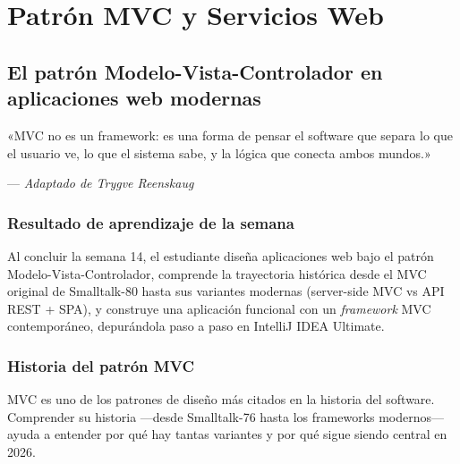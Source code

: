 \part{Patrón MVC y Servicios Web}

\chapter{El patrón Modelo-Vista-Controlador en aplicaciones web modernas}
\label{cap:semana14}

\epigraph{«MVC no es un framework: es una forma de pensar el software
que separa lo que el usuario ve, lo que el sistema sabe, y la lógica
que conecta ambos mundos.»}{--- \textit{Adaptado de Trygve Reenskaug}}

\section*{Resultado de aprendizaje de la semana}
Al concluir la semana 14, el estudiante diseña aplicaciones web bajo
el patrón Modelo-Vista-Controlador, comprende la trayectoria histórica
desde el MVC original de Smalltalk-80 hasta sus variantes modernas
(server-side MVC vs API REST + SPA), y construye una aplicación
funcional con un \emph{framework} MVC contemporáneo, depurándola paso
a paso en IntelliJ IDEA Ultimate.

\section{Historia del patrón MVC}

MVC es uno de los patrones de diseño más citados en la
historia del software. Comprender su historia ---desde Smalltalk-76
hasta los frameworks modernos--- ayuda a entender por qué hay tantas
variantes y por qué sigue siendo central en 2026.


